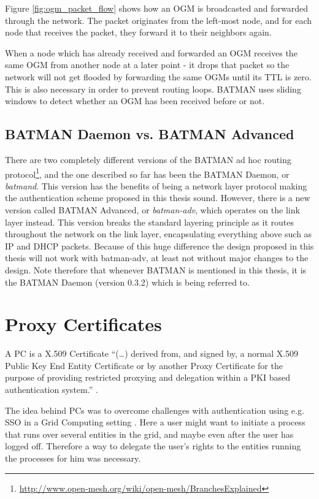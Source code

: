 Figure \ref{fig:ogm_packet_flow} shows how an \ac{OGM} is broadcasted and
forwarded through the network. The packet originates from the left-most node,
and for each node that receives the packet, they forward it to their neighbors
again.

When a node which has already received and forwarded an \ac{OGM} receives the
same \ac{OGM} from another node at a later point - it drops that packet so the
network will not get flooded by forwarding the same \acp{OGM} until its \ac{TTL}
is zero. This is also necessary in order to prevent routing loops. BATMAN uses
sliding windows to detect whether an \ac{OGM} has been received before or not.

\subsection{BATMAN Daemon vs. BATMAN Advanced}
There are two completely different versions of the BATMAN ad hoc routing
protocol\footnote{\url{http://www.open-mesh.org/wiki/open-mesh/BranchesExplained}},
and the one described so far has been the BATMAN Daemon, or \emph{batmand}. This
version has the benefits of being a network layer protocol making the
authentication scheme proposed in this thesis sound. However, there is a new
version called BATMAN Advanced, or \emph{batman-adv}, which operates on the
link layer instead. This version breaks the standard layering principle as it
routes throughout the network on the link layer, encapsulating everything above
such as IP and DHCP packets. Because of this huge difference the design
proposed in this thesis will not work with batman-adv, at least not without
major changes to the design. Note therefore that whenever BATMAN is mentioned
in this thesis, it is the BATMAN Daemon (version 0.3.2) which is being referred
to.

\section{Proxy Certificates}
\label{sect:pc}
A \acf{PC} is a X.509 Certificate ``(\ldots) derived from, and signed by, a
normal X.509 Public Key End Entity Certificate or by another Proxy Certificate
for the purpose of providing restricted proxying and delegation within a PKI
based authentication system.'' \cite{rfc3820}.

The idea behind \acp{PC} was to overcome challenges with authentication
using e.g. \ac{SSO} in a Grid Computing setting \cite{foster1998security}. Here
a user might want to initiate a process that runs over several entities in the
grid, and maybe even after the user has logged off. Therefore a way to delegate
the user's rights to the entities running the processes for him was necessary.

